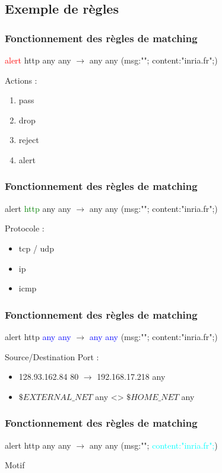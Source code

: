 \documentclass{beamer}
\begin{document}
\subsection{Exemple de règles}
\begin{frame}
\frametitle{Fonctionnement des règles de matching}
\begin{center}
\textcolor{red}{alert} http any any $\rightarrow$ any any (msg:""; content:"inria.fr";)
\end{center}
Actions :
\begin{enumerate}
\item pass
\item drop
\item reject
\item alert
\end{enumerate}
\end{frame}

\begin{frame}
\frametitle{Fonctionnement des règles de matching}
\begin{center}
alert \textcolor{green}{http} any any $\rightarrow$ any any (msg:""; content:"inria.fr";)
\end{center}
Protocole :
\begin{itemize}
[triangle]
\item tcp / udp
\item ip
\item icmp
\end{itemize}
\end{frame}

\begin{frame}
\frametitle{Fonctionnement des règles de matching}
\begin{center}
alert http \textcolor{blue}{any any}  $\rightarrow$ \textcolor{blue}{any any} (msg:""; content:"inria.fr";)
\end{center}
Source/Destination Port :
\begin{itemize}
[triangle]
\item 128.93.162.84 80 $\rightarrow$ 192.168.17.218 any
\item $\$EXTERNAL\_NET$ any <> $\$HOME\_NET$ any
\end{itemize}
\end{frame}

\begin{frame}
\frametitle{Fonctionnement des règles de matching}
\begin{center}
alert http any any $\rightarrow$ any any (msg:""; \textcolor{cyan}{content:"inria.fr";})
\end{center}
\begin{center}
Motif
\end{center}
\end{frame}
\end{document}
